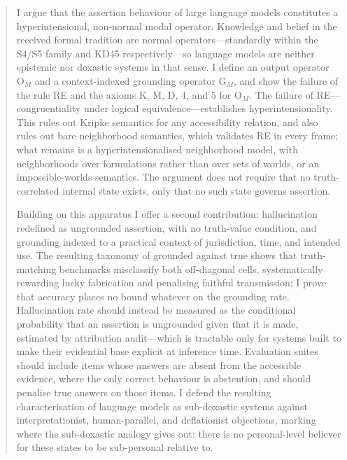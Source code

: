 \begin{abstract}
I argue that the assertion behaviour of large language models constitutes a
hyperintensional, non-normal modal operator. Knowledge and belief in the
received formal tradition are normal operators---standardly within the S4/S5
family and KD45 respectively---so language models are neither epistemic nor
doxastic systems in that sense. I define an output operator $\mathrm{O}_M$ and
a context-indexed grounding operator $\mathrm{G}_M$, and show the failure of
the rule RE and the axioms K, M, D, 4, and 5 for $\mathrm{O}_M$. The failure of
RE---congruentiality under logical equivalence---establishes
hyperintensionality. This rules out Kripke semantics for any accessibility
relation, and also rules out bare neighborhood semantics, which validates RE in
every frame; what remains is a hyperintensionalised neighborhood model, with
neighborhoods over formulations rather than over sets of worlds, or an
impossible-worlds semantics. The argument does not require that no
truth-correlated internal state exists, only that no such state governs
assertion.

Building on this apparatus I offer a second contribution: hallucination
redefined as ungrounded assertion, with no truth-value condition, and grounding
indexed to a practical context of jurisdiction, time, and intended use. The
resulting taxonomy of grounded against true shows that truth-matching
benchmarks misclassify both off-diagonal cells, systematically rewarding lucky
fabrication and penalising faithful transmission; I prove that accuracy places
no bound whatever on the grounding rate. Hallucination rate should instead be
measured as the conditional probability that an assertion is ungrounded given
that it is made, estimated by attribution audit---which is tractable only for
systems built to make their evidential base explicit at inference time.
Evaluation suites should include items whose answers are absent from the
accessible evidence, where the only correct behaviour is abstention, and should
penalise true answers on those items. I defend the resulting characterisation of
language models as sub-doxastic systems against interpretationist,
human-parallel, and deflationist objections, marking where the sub-doxastic
analogy gives out: there is no personal-level believer for these states to be
sub-personal relative to.
\end{abstract}
